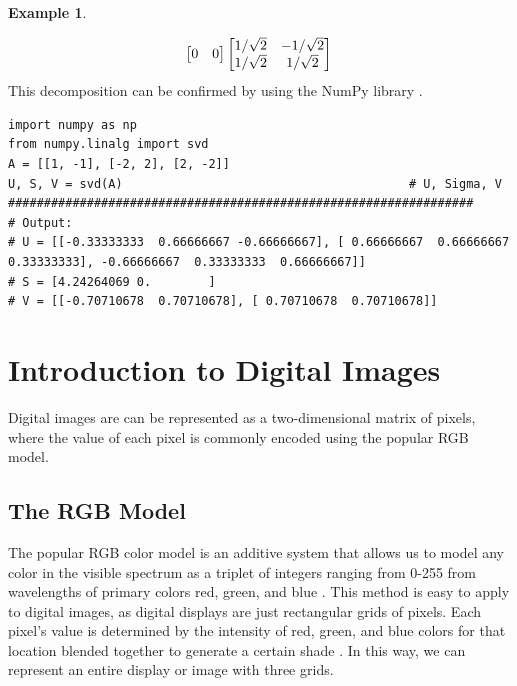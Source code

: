 \documentclass[12pt, reqno]{amsart}
\theoremstyle{definition}
\newtheorem{example}[theorem]{Example}
\theoremstyle{remark}
\numberwithin{equation}{section}
\begin{document}
\begin{example}
\begin{enumerate}
\begin{equation}
\begin{bmatrix}
                    0 & 0
                \end{bmatrix}
                \begin{bmatrix}
                    1/\sqrt{2} & -1/\sqrt{2}\\
                    1/\sqrt{2} & 1/\sqrt{2}
                \end{bmatrix}\\
            \end{equation}
        This decomposition can be confirmed by using the NumPy library \cite{Lakhotia}.
\begin{lstlisting}
import numpy as np
from numpy.linalg import svd
A = [[1, -1], [-2, 2], [2, -2]]
U, S, V = svd(A)                                        # U, Sigma, V
#################################################################
# Output:
# U = [[-0.33333333  0.66666667 -0.66666667], [ 0.66666667  0.66666667  0.33333333], -0.66666667  0.33333333  0.66666667]]
# S = [4.24264069 0.        ]
# V = [[-0.70710678  0.70710678], [ 0.70710678  0.70710678]]
\end{lstlisting}
    \end{enumerate}
\end{example}
\section{Introduction to Digital Images}
\noindent Digital images are can be represented as a two-dimensional matrix of pixels, where the value of each pixel is commonly encoded using the popular RGB model.
\subsection{The RGB Model}
The popular RGB color model is an additive system that allows us to model any color in the visible spectrum as a triplet of integers ranging from 0-255 from wavelengths of primary colors red, green, and blue \cite{Zelazko}. This method is easy to apply to digital images, as digital displays are just rectangular grids of pixels. Each pixel's value is determined by the intensity of red, green, and blue colors for that location blended together to generate a certain shade \cite{Devi}. In this way, we can represent an entire display or image with three grids.
\end{document}
